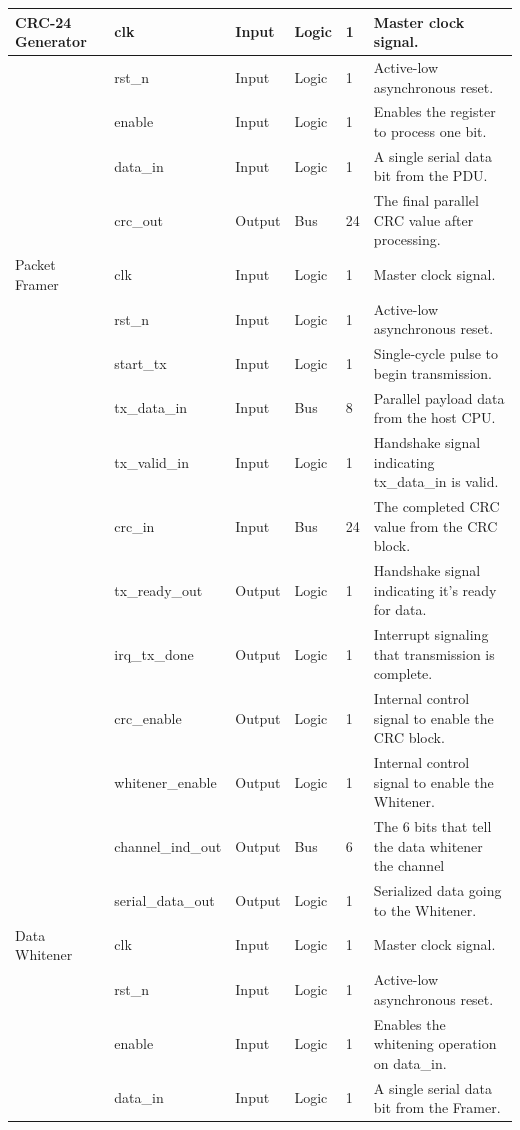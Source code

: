 \documentclass[12pt,singleside,a4paper]{report}
\begin{document}
\begin{longtable}{|p{2.5cm}|p{3cm}|p{1.5cm}|p{1.5cm}|p{1.2cm}|p{4.5cm}|}
CRC-24 Generator & clk & Input & Logic & 1 & Master clock signal. \\ \hline
~ & rst\_n & Input & Logic & 1 & Active-low asynchronous reset. \\ \hline
~ & enable & Input & Logic & 1 & Enables the register to process one bit. \\ \hline
~ & data\_in & Input & Logic & 1 & A single serial data bit from the PDU. \\ \hline
~ & crc\_out & Output & Bus & 24 & The final parallel CRC value after processing. \\ \hline
Packet Framer & clk & Input & Logic & 1 & Master clock signal. \\ \hline
~ & rst\_n & Input & Logic & 1 & Active-low asynchronous reset. \\ \hline
~ & start\_tx & Input & Logic & 1 & Single-cycle pulse to begin transmission. \\ \hline
~ & tx\_data\_in & Input & Bus & 8 & Parallel payload data from the host CPU. \\ \hline
~ & tx\_valid\_in & Input & Logic & 1 & Handshake signal indicating tx\_data\_in is valid. \\ \hline
~ & crc\_in & Input & Bus & 24 & The completed CRC value from the CRC block. \\ \hline
~ & tx\_ready\_out & Output & Logic & 1 & Handshake signal indicating it's ready for data. \\ \hline
~ & irq\_tx\_done & Output & Logic & 1 & Interrupt signaling that transmission is complete. \\ \hline
~ & crc\_enable & Output & Logic & 1 & Internal control signal to enable the CRC block. \\ \hline
~ & whitener\_enable & Output & Logic & 1 & Internal control signal to enable the Whitener. \\ \hline
~ & channel\_ind\_out & Output & Bus & 6 & The 6 bits that tell the data whitener the channel \\ \hline
~ & serial\_data\_out & Output & Logic & 1 & Serialized data going to the Whitener. \\ \hline
Data Whitener & clk & Input & Logic & 1 & Master clock signal. \\ \hline
~ & rst\_n & Input & Logic & 1 & Active-low asynchronous reset. \\ \hline
~ & enable & Input & Logic & 1 & Enables the whitening operation on data\_in. \\ \hline
~ & data\_in & Input & Logic & 1 & A single serial data bit from the Framer. \\ \hline

\end{longtable}
\end{document}

